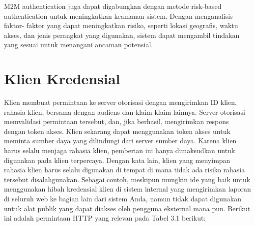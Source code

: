 M2M authentication juga dapat digabungkan dengan metode risk-based authentication untuk meningkatkan keamanan sistem. Dengan menganalisis faktor- faktor yang dapat meningkatkan risiko, seperti lokasi geografis, waktu akses, dan jenis perangkat yang digunakan, sistem dapat mengambil tindakan yang sesuai untuk menangani ancaman potensial.

\section{Klien Kredensial}
Klien membuat permintaan ke server otorisasi dengan mengirimkan ID klien, rahasia klien, bersama dengan audiens dan klaim-klaim lainnya. Server otorisasi memvalidasi permintaan tersebut, dan, jika berhasil, mengirimkan respons dengan token akses. Klien sekarang dapat menggunakan token akses untuk meminta sumber daya yang dilindungi dari server sumber daya.
Karena klien harus selalu menjaga rahasia klien, pemberian ini hanya dimaksudkan untuk digunakan pada klien terpercaya. Dengan kata lain, klien yang menyimpan rahasia klien harus selalu digunakan di tempat di mana tidak ada risiko rahasia tersebut disalahgunakan. Sebagai contoh, meskipun mungkin ide yang baik untuk menggunakan hibah kredensial klien di sistem internal yang mengirimkan laporan di seluruh web ke bagian lain dari sistem Anda, namun tidak dapat digunakan untuk alat publik yang dapat diakses oleh pengguna eksternal mana pun.
Berikut ini adalah permintaan HTTP yang relevan pada Tabel 3.1 berikut:

